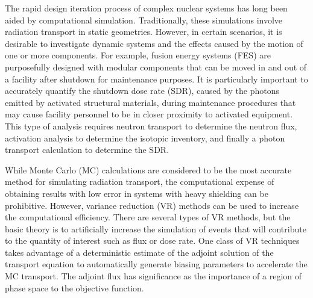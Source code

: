 \documentclass[12pt]{article}
\begin{document}
\maketitle

The rapid design iteration process of complex nuclear systems has long been
aided by computational simulation.  Traditionally, these simulations
involve radiation transport in static geometries.  However, in certain
scenarios, it is desirable to investigate dynamic systems and the effects caused
by the motion of one or more components.  
For example, fusion energy systems (FES) are purposefully designed with modular components that can be moved in and
out of a facility after shutdown for maintenance purposes.  
  It is particularly important to accurately quantify 
the shutdown dose rate (SDR), caused by the photons emitted by activated structural materials,
during maintenance procedures that may cause facility personnel to be in closer
proximity to activated equipment.
This type of analysis requires neutron transport to determine the neutron flux,
activation analysis to determine the isotopic inventory, and finally a 
photon transport calculation to determine the SDR.

While Monte Carlo (MC) calculations are considered to be the most accurate method for simulating
radiation transport, the computational expense of obtaining results with low
error 
in systems with heavy shielding can be prohibitive.  
However, variance reduction (VR)
methods can be used to increase the computational efficiency.  
There are several types
of VR methods, but the basic theory is to artificially increase the simulation of
events that will contribute to the quantity of interest such as flux or dose
rate. 
 One class of VR techniques takes advantage of a deterministic estimate of the adjoint 
solution of the transport equation to automatically
generate biasing parameters to accelerate the MC transport. 
The adjoint flux has significance as the importance of a region of
phase space to the objective function.
\end{document}
